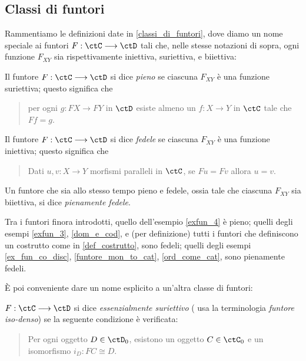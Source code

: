 \subsection{Classi di funtori}\label{ssec:classi_di_funtori}
Rammentiamo le definizioni date in \ref{classi_di_funtori}, dove diamo un nome speciale ai funtori \(F : \ctC\fun\ctD\) tali che, nelle stesse notazioni di sopra, ogni funzione \(F_{XY}\) sia rispettivamente iniettiva, suriettiva, e biiettiva:
\begin{definition}\label{funtore_pieno}
	Il funtore \(F : \ctC\fun\ctD\) si dice \emph{pieno} se ciascuna \(F_{XY}\) è una funzione suriettiva; questo significa che
	\begin{quote}
		per ogni \(g : FX\to FY\) in \(\ctD\) esiste almeno un \(f : X\to Y\) in \(\ctC\) tale che \(Ff=g\).
	\end{quote}
\end{definition}
\begin{definition}\label{funtore_fedele}
	Il funtore \(F : \ctC\fun\ctD\) si dice \emph{fedele} se ciascuna \(F_{XY}\) è una funzione iniettiva; questo significa che
	\begin{quote}
		Dati \(u,v : X\to Y\) morfismi paralleli in \(\ctC\), se \(Fu=Fv\) allora \(u=v\).
	\end{quote}
\end{definition}
\begin{notation}\label{fun_pienfed}
	Un funtore che sia allo stesso tempo pieno e fedele, ossia tale che ciascuna \(F_{XY}\) sia biiettiva, si dice \emph{pienamente fedele}.
\end{notation}
\begin{remark}
	Tra i funtori finora introdotti, quello dell'esempio \ref{exfun_4} è pieno; quelli degli esempi \ref{exfun_3}, \ref{dom_e_cod}, e (per definizione) tutti i funtori che definiscono un costrutto come in \ref{def_costrutto}, sono fedeli; quelli degli esempi \ref{ex_fun_co_disc}, \ref{funtore_mon_to_cat}, \ref{ord_come_cat}, sono pienamente fedeli.
\end{remark}
\`E poi conveniente dare un nome esplicito a un'altra classe di funtori:
\begin{definition}\label{funtore_essurj}
	\(F : \ctC\fun\ctD\) si dice \emph{essenzialmente suriettivo} (\cite{acc} usa la terminologia \emph{funtore iso-denso}) se la seguente condizione è verificata:
	\begin{quote}
		Per ogni oggetto \(D\in\ctD_0\), esistono un oggetto \(C\in\ctC_0\) e un isomorfismo \(i_D : FC\cong D\).
	\end{quote}
\end{definition}
